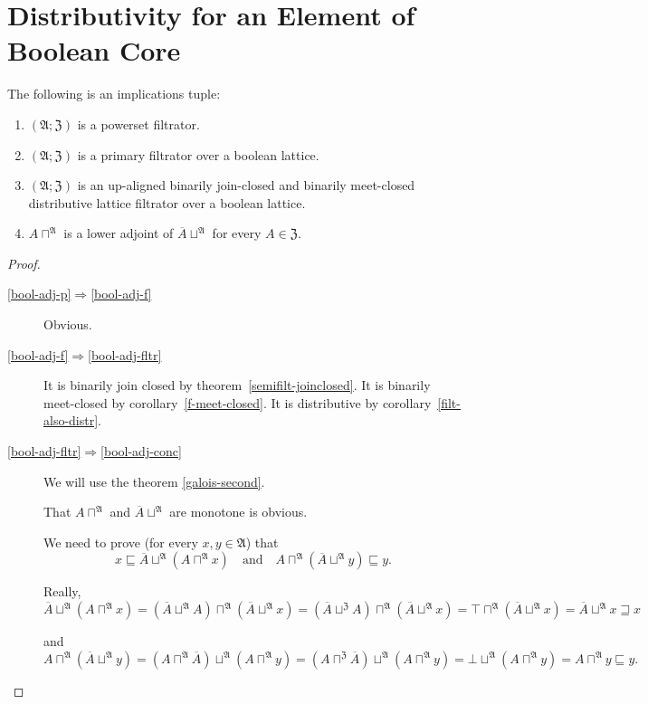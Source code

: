 \section{Distributivity for an Element of Boolean Core}
\begin{lem}
\label{bb-bool-adj}The following is an implications tuple:
\begin{enumerate}
\item \label{bool-adj-p}$(\mathfrak{A};\mathfrak{Z})$ is a powerset filtrator.
\item \label{bool-adj-f}$(\mathfrak{A};\mathfrak{Z})$ is a primary filtrator
over a boolean lattice.
\item \label{bool-adj-fltr}$(\mathfrak{A};\mathfrak{Z})$ is an up-aligned
binarily join-closed and binarily meet-closed distributive lattice
filtrator over a boolean lattice.
\item \label{bool-adj-conc}$A\sqcap^{\mathfrak{A}}$ is a lower adjoint
of $\overline{A}\sqcup^{\mathfrak{A}}$ for every $A\in\mathfrak{Z}$.
\end{enumerate}
\end{lem}
\begin{proof}
~
\begin{description}
\item [{\ref{bool-adj-p}$\Rightarrow$\ref{bool-adj-f}}] Obvious.
\item [{\ref{bool-adj-f}$\Rightarrow$\ref{bool-adj-fltr}}] It is binarily join closed by theorem~\ref{semifilt-joinclosed}.
It is binarily meet-closed by corollary~\ref{f-meet-closed}. It is distributive by
corollary~\ref{filt-also-distr}.
\item [{\ref{bool-adj-fltr}$\Rightarrow$\ref{bool-adj-conc}}] We will
use the theorem \ref{galois-second}.


That $A\sqcap^{\mathfrak{A}}$ and $\overline{A}\sqcup^{\mathfrak{A}}$
are monotone is obvious.


We need to prove (for every $x,y\in\mathfrak{A}$) that
\[
x\sqsubseteq\overline{A}\sqcup^{\mathfrak{A}}(A\sqcap^{\mathfrak{A}}x)\quad\text{and}\quad A\sqcap^{\mathfrak{A}}(\overline{A}\sqcup^{\mathfrak{A}}y)\sqsubseteq y.
\]



Really,
\[
\overline{A}\sqcup^{\mathfrak{A}}(A\sqcap^{\mathfrak{A}}x)=(\overline{A}\sqcup^{\mathfrak{A}}A)\sqcap^{\mathfrak{A}}(\overline{A}\sqcup^{\mathfrak{A}}x)=(\overline{A}\sqcup^{\mathfrak{Z}}A)\sqcap^{\mathfrak{A}}(\overline{A}\sqcup^{\mathfrak{A}}x)=\top\sqcap^{\mathfrak{A}}(\overline{A}\sqcup^{\mathfrak{A}}x)=\overline{A}\sqcup^{\mathfrak{A}}x\sqsupseteq x
\]



and
\[
A\sqcap^{\mathfrak{A}}(\overline{A}\sqcup^{\mathfrak{A}}y)=(A\sqcap^{\mathfrak{A}}\overline{A})\sqcup^{\mathfrak{A}}(A\sqcap^{\mathfrak{A}}y)=(A\sqcap^{\mathfrak{Z}}\overline{A})\sqcup^{\mathfrak{A}}(A\sqcap^{\mathfrak{A}}y)=\bot\sqcup^{\mathfrak{A}}(A\sqcap^{\mathfrak{A}}y)=A\sqcap^{\mathfrak{A}}y\sqsubseteq y.
\]


\end{description}
\end{proof}
